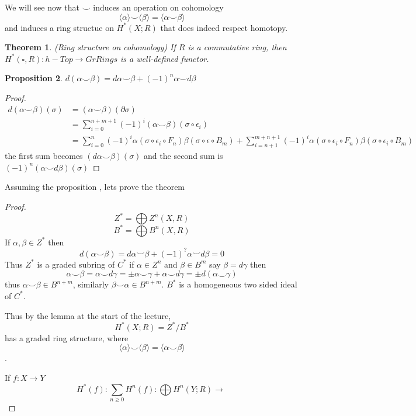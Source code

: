\documentclass[11pt]{article}
\newtheorem{thm}{Theorem}[section]
\newtheorem{prop}[thm]{Proposition}
\newcommand{\pd}{\partial}
\newcommand{\lrta}{\longrightarrow}
\newcommand{\lgl}{\langle}
\newcommand{\rgl}{\rangle}
\begin{document}
We will see now that $\smile$ induces an operation on cohomology
$$
\lgl\alpha\rgl\smile\lgl\beta\rgl=\lgl\alpha\smile\beta\rgl
$$
and induces a ring structue on $H^*(X;R)$ that does indeed respect homotopy.


\begin{thm}(Ring structure on cohomology)
If $R$ is a commutative ring, then 
$H^*(\square, R): h-Top\lrta GrRings$ is a well-defined functor.
\end{thm}

\begin{prop}
$d(\alpha\smile\beta)=d\alpha\smile \beta+(-1)^n\alpha\smile d\beta$
\end{prop}
\begin{proof}
$$
\begin{aligned}
d(\alpha\smile \beta)(\sigma)&=(\alpha\smile\beta)(\pd\sigma)\\
&=\sum_{i=0}^{n+m+1}(-1)^i(\alpha\smile \beta)(\sigma\circ \epsilon_i)\\
&=\sum_{i=0}^{n}(-1)^i
\alpha(\sigma\circ \epsilon_i\circ F_n)\beta(\sigma\circ \epsilon\circ B_m)+\sum_{i=n+1}^{m+n+1}(-1)^i\alpha(\sigma\circ\epsilon_i\circ F_n)\beta(\sigma\circ \epsilon_i\circ B_m)
\end{aligned}
$$
the first sum becomes $(d\alpha\smile \beta)(\sigma)$ and the second sum is $(-1)^n(\alpha\smile d\beta)(\sigma)$
\end{proof}

Assuming the proposition , lets prove the theorem

\begin{proof}
$$
Z^*=\bigoplus Z^n(X,R)
$$
$$
B^*=\bigoplus B^n(X,R)
$$
If $\alpha,\beta\in Z^*$ then 
$$
d(\alpha\smile \beta)=d\alpha\smile \beta+(-1)^{?}\alpha\smile d\beta=0
$$
Thus $Z^*$ is a graded subring of $C^*$ if $\alpha\in Z^n$ and $\beta\in B^m$ say $\beta=d \gamma$
then
$$
\alpha\smile \beta=\alpha\smile d\gamma=\pm \alpha\smile \gamma+\alpha \smile d\gamma=\pm d(\alpha\smile \gamma)
$$
thus $\alpha\smile \beta\in B^{n+m}$, similarly $\beta\smile \alpha\in B^{n+m}$. $B^*$ is a homogeneous two sided ideal of $C^*$.

Thus by the lemma at the start of the lecture,
$$
H^*(X;R)=Z^*/B^*
$$
has a graded ring structure, where
$$
\lgl\alpha\rgl\smile\lgl\beta\rgl=\lgl\alpha\smile\beta\rgl
$$.

If $f:X\lrta Y$
$$
H^*(f):\sum_{n\geq 0}H^n(f):\bigoplus H^n(Y;R)\lrta \
$$
\end{proof}
\end{document}
